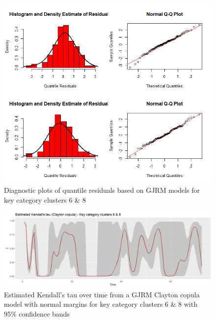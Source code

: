 \begin{figure}[H]
\centering
  \includegraphics[width=0.95\linewidth]{figures/res_hist_qqplot_68.png}
  \caption{Diagnostic plots of quantile residuals based on \ac{GJRM} models for key category clusters 6 \& 8}
  \label{fig:res_hist_qqplot_68}
\end{figure}



\begin{figure}[H]
\centering
  \includegraphics[width=0.95\linewidth]{figures/estimated_tau_clayton_kcc_68.png}
  \caption{Estimated Kendall's tau over time from a \ac{GJRM} Clayton copula model with normal margins for key category clusters 6 \& 8 with 95\% confidence bands}
  \label{fig:estimated_tau_clayton_kcc_68}
\end{figure}




